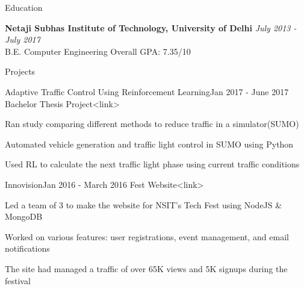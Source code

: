 \documentclass{resume} %
\begin{document}

\begin{rSection}{Education}

    {\bf Netaji Subhas Institute of Technology, University of Delhi} \hfill {\em July 2013 - July 2017} 
    \\ B.E. Computer Engineering \hfill { Overall GPA: 7.35/10}

\end{rSection}

\begin{rSection}{Projects}

    \begin{rSubsection}{Adaptive Traffic Control Using Reinforcement Learning}{Jan 2017 - June 2017}
    {Bachelor Thesis Project}{<link>}

        \item Ran study comparing different methods to reduce traffic in a simulator(SUMO)
        \item Automated vehicle generation and traffic light control in SUMO using Python
        \item Used RL to calculate the next traffic light phase using current traffic conditions
    \end{rSubsection}

    \begin{rSubsection}{Innovision}{Jan 2016 - March 2016}
    {Fest Website}{<link>}

        \item Led a team of 3 to make the website for NSIT’s Tech Fest using NodeJS \& MongoDB
        \item Worked on various features: user registrations, event management, and email notifications
        \item The site had managed a traffic of over 65K views and 5K signups during the festival
    \end{rSubsection}

\end{rSection}
\end{document}
